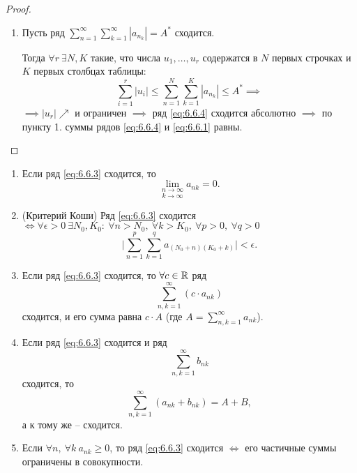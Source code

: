 \begin{proof}
\begin{enumerate}
        \item Пусть ряд $\sum_{n=1}^{\infty}\sum_{k=1}^{\infty}|a_{n_k}| = A^*$ сходится.

              Тогда $\forall r \ \exists N,K$ такие, что числа $u_1,\ldots,u_r$ содержатся в $N$ первых строчках и $K$ первых столбцах таблицы:
              \[
                  \sum_{i=1}^{r}|u_i| \leqslant \sum_{n=1}^{N}\sum_{k=1}^{K}|a_{n_k}| \leqslant A^* \implies
              \]
              $\implies |u_r|\nearrow$ и ограничен $\implies$ ряд \ref{eq:6.6.4} сходится абсолютно $\implies$ по пункту 1. суммы рядов \ref{eq:6.6.4} и \ref{eq:6.6.1} равны.
    \end{enumerate}
\end{proof}

\begin{theorem}\leavevmode
    \begin{enumerate}
        \item Если ряд \ref{eq:6.6.3} сходится, то
              \[
                  \underset{k\rightarrow\infty}{\underset{n\rightarrow\infty}{\lim}}a_{nk} = 0.
              \]

        \item (Критерий Коши)
              Ряд \ref{eq:6.6.3} сходится $\iff \forall \epsilon > 0 \ \exists N_0,K_0: \ \forall n > N_0, \ \forall k > K_0, \ \forall p > 0, \ \forall q > 0$
              \[
                  \bigg|\sum_{n=1}^{p}\sum_{k=1}^{q}a_{(N_0 + n)(K_0 + k)}\bigg| < \epsilon.
              \]

        \item Если ряд \ref{eq:6.6.3} сходится, то $\forall c \in \mathbb{R}$ ряд
              \[
                  \sum_{n,k=1}^{\infty}(c\cdot a_{nk})
              \]
              сходится, и его сумма равна $c\cdot A$ (где $A = \sum_{n,k=1}^{\infty}a_{nk}$).

        \item Если ряд \ref{eq:6.6.3} сходится и ряд
              \[
                  \sum_{n,k=1}^{\infty}b_{nk}
              \]
              сходится, то
              \[
                  \sum_{n,k=1}^{\infty}(a_{nk} + b_{nk}) = A + B,
              \]
              а к тому же -- сходится.

        \item Если $\forall n, \ \forall k \ a_{nk} \geqslant 0$, то ряд \ref{eq:6.6.3} сходится $ \iff $ его частичные суммы ограничены в совокупности.
    \end{enumerate}
\end{theorem}

